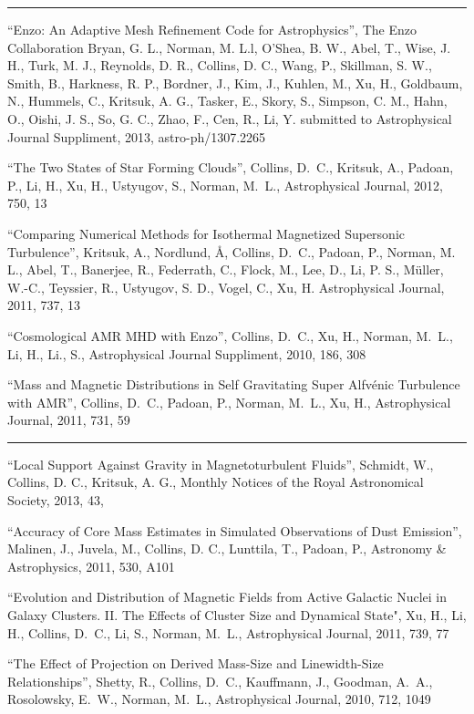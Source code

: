 \rule[3pt]{424pt}{.1mm}

\noindent ``Enzo: An Adaptive Mesh Refinement Code for Astrophysics'', The Enzo
Collaboration 
Bryan, G. L., Norman, M. L.l, O’Shea, B. W.,  Abel, T.,  Wise, J. H.,
Turk, M. J., 
Reynolds, D. R.,
Collins, D. C.,
Wang, P., Skillman, S. W., Smith, B., Harkness, R. P., Bordner, J.,
Kim, J., Kuhlen, M., Xu, H.,
Goldbaum, N., Hummels, C., Kritsuk, A. G., Tasker, E., 
Skory, S., Simpson, C. M., Hahn, O., Oishi, J. S., So, G. C.,
Zhao, F., Cen, R., Li, Y.
submitted to Astrophysical Journal Suppliment, 2013,
astro-ph/1307.2265


\medskip
\noindent 
``The Two States of Star Forming Clouds'', 
Collins, D.~C., Kritsuk, A., Padoan, P., Li, H., Xu, H., Ustyugov, S., Norman, M.~L.,
Astrophysical Journal, 2012, 750, 13

\medskip
\noindent
``Comparing Numerical
Methods for Isothermal Magnetized Supersonic Turbulence'', 
Kritsuk, A., Nordlund, \AA, Collins, D.~C., 
Padoan, P., Norman, M. L., Abel, T., Banerjee, R., Federrath, C., Flock, M.,
Lee, D., Li, P. S., M\"uller, W.-C., Teyssier, R., Ustyugov, S. D., Vogel, C.,
Xu, H.
Astrophysical Journal, 2011, 737, 13

\medskip
\noindent ``Cosmological AMR MHD with Enzo'', 
Collins, D.~C., Xu, H., Norman, M.~L., Li, H., Li., S.,
Astrophysical Journal Suppliment, 2010, 186, 308

\medskip
\noindent
``Mass and Magnetic Distributions in Self Gravitating Super Alfv\' enic Turbulence with AMR'', 
Collins, D.~C., Padoan, P., Norman, M.~L., Xu, H.,
Astrophysical Journal, 2011, 731, 59

\medskip
{}\rule[3pt]{367pt}{.1mm}

\medskip
\noindent
``Local Support Against Gravity in Magnetoturbulent Fluids'',
Schmidt, W., Collins, D. C., Kritsuk, A. G.,
Monthly Notices of the Royal Astronomical Society, 2013, 43, 

\medskip
\noindent
``Accuracy of Core Mass Estimates in Simulated Observations of Dust Emission'', 
Malinen, J., Juvela, M., Collins, D. C., Lunttila, T., Padoan, P.,
Astronomy \& Astrophysics, 2011, 530, A101


\medskip
\noindent
``Evolution and Distribution of Magnetic Fields from Active Galactic Nuclei in
Galaxy Clusters. II. The Effects of Cluster Size and Dynamical State",
Xu, H., Li, H., Collins, D.~C., Li, S., Norman, M.~L.,
Astrophysical Journal, 2011, 739, 77

\medskip
\noindent
``The Effect of Projection on Derived Mass-Size and Linewidth-Size Relationships'', 
Shetty, R., Collins, D.~C.,  Kauffmann, J.,  Goodman, A.~A.,  Rosolowsky, E.~W.,  Norman, M.~L., 
Astrophysical Journal, 2010, 712, 1049


\medskip
